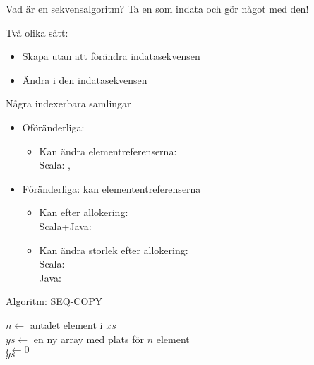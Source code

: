 

\begin{Slide}{Vad är en sekvensalgoritm?}
Ta en  som indata och gör något med den! \\ \vspace{2em}

Två olika sätt:
\begin{itemize} 
\item Skapa  utan att förändra indatasekvensen
\item Ändra   i den  indatasekvensen
\end{itemize}

\end{Slide}


\begin{Slide}{Några indexerbara samlingar}
\begin{itemize}
\item Oföränderliga:  
  \begin{itemize} 
  \item Kan  ändra elementreferenserna: \\ 
    Scala: , 
  \end{itemize}

\item Föränderliga: kan  elemententreferenserna
  \begin{itemize} 
  \item Kan  efter allokering: \\ Scala+Java:  
  \item Kan ändra storlek efter allokering: \\ Scala:  \\ Java: 
  \end{itemize}
\end{itemize}
\end{Slide}

\begin{Slide}{Algoritm: SEQ-COPY}
\begin{algorithm}[H]
 $n \leftarrow$ antalet element i $xs$ \\
 $ys \leftarrow$ en ny array med plats för $n$ element\\
 $i \leftarrow 0$  \\
 \Return $ys$
\end{algorithm}
\end{Slide}








